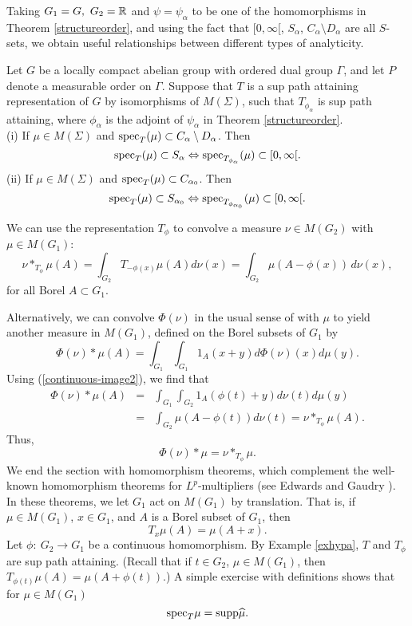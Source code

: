 \documentclass[12pt,leqno]{article}
\def\R{\Bbb R}
\def\supp{{\rm supp}}
\def\spec{{\rm spec}}
\begin{document}
Taking $G_1=G,\ G_2=\R$ and $\psi=\psi_\alpha$ to be one of the 
homomorphisms in Theorem \ref{structureorder}, 
and using the fact that $[0,\infty[$, $S_\alpha$,
$C_\alpha\setminus D_\alpha$ are all $S$-sets,
we obtain  useful relationships between different 
types of analyticity.


\begin{thm}\label{equiv-def}
Let $G$ be a locally compact abelian group with ordered dual group
$\Gamma$, and let $P$ denote a measurable order on $\Gamma$.  
Suppose that $T$ is a sup path attaining representation
of $G$ by isomorphisms of $M(\Sigma)$, such that $T_{\phi_\alpha}$ is sup path attaining, where 
$\phi_\alpha$ is the adjoint of $\psi_\alpha$ in Theorem \ref{structureorder}.\\
(i)  If $\mu\in M(\Sigma)$ and 
$\spec_T(\mu)\subset C_\alpha\setminus D_\alpha$.
Then
$$\spec_T(\mu)\subset S_\alpha\Leftrightarrow
\spec_{T_{\phi_\alpha}}(\mu)\subset [0,\infty[.$$
(ii)  
If $\mu\in M(\Sigma)$ and 
$\spec_T(\mu)\subset C_{\alpha_0}$.
Then
$$\spec_T(\mu)\subset S_{\alpha_0}\Leftrightarrow
\spec_{T_{\phi_{\alpha_0}}}(\mu)\subset [0,\infty[.$$
\end{thm}

We can use the representation $T_\phi$
to convolve a measure $\nu\in M(G_2)$
with $\mu\in M(G_1)$:
$$\nu*_{T_\phi}\mu(A)=\int_{G_2}T_{-\phi(x)}\mu(A)d\nu(x)=\int_{G_2}\mu(A-\phi(x))\,d\nu(x) ,$$
for all Borel $A\subset G_1$.  

Alternatively, we can convolve
$\Phi(\nu)$ 
 in the usual sense of \cite[Definition 19.8]{hr1} 
with $\mu$ to yield
another measure in $M(G_1)$, defined on the Borel subsets of $G_1$ by
$$\Phi(\nu)*\mu(A)=\int_{G_1}\int_{G_1}1_A(x+y)d\Phi(\nu)(x)d\mu(y).$$
Using (\ref{continuous-image2}), we find that
\begin{eqnarray*}
\Phi(\nu)*\mu(A)        &=&
\int_{G_1}\int_{G_2}1_A(\phi(t)+y)d\nu(t)d\mu(y)\\
			&=&
\int_{G_2}\mu(A-\phi(t))d\nu(t)
=\nu *_{T_\phi}\mu(A).
\end{eqnarray*}
Thus, 
\begin{equation}
\Phi(\nu)*\mu=\nu*_{T_\phi}\mu.
\label{7.feb.95.2}
\end{equation}
We end the section 
with homomorphism theorems, which complement the well-known
homomorphism theorems for $L^p$-multipliers 
(see Edwards and Gaudry \cite[Appendix B]{eg}).
In these theorems, we let $G_1$ act on $M(G_1)$ by translation.  That is, if $\mu\in M(G_1)$, $x\in G_1$,
and $A$ is a Borel subset of $G_1$, then
$$T_x\mu(A)=\mu(A+x).$$
Let $\phi:\ G_2\rightarrow G_1$ be a continuous homomorphism.
By Example \ref{exhypa}, $T$ and $T_\phi$ are sup path attaining.
(Recall that if $t\in G_2$, $\mu\in M(G_1)$,
then $T_{\phi(t)}\mu(A)=\mu(A+\phi(t))$.)
A simple exercise with definitions shows that
for $\mu\in M(G_1)$ 
$$\spec_T\mu=\supp \widehat{\mu}.$$
\end{document}
